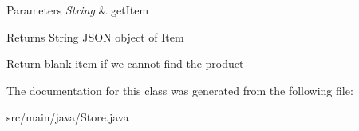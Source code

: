 \begin{DoxyParams}{Parameters}
{\em String} & get\+Item \\
\hline
\end{DoxyParams}
\begin{DoxyReturn}{Returns}
String J\+S\+O\+N object of Item 
\end{DoxyReturn}
Return blank item if we cannot find the product 

The documentation for this class was generated from the following file\+:\begin{DoxyCompactItemize}
\item 
src/main/java/Store.\+java\end{DoxyCompactItemize}
